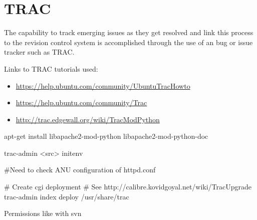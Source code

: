\chapter{TRAC}
        
The capability to track emerging issues as they get resolved and link
this process to the revision control system is accomplished through the use
of an bug or issue tracker such as TRAC.
        
Links to TRAC tutorials used:
\begin{itemize} 
  \item \url{https://help.ubuntu.com/community/UbuntuTracHowto}
  \item \url{https://help.ubuntu.com/community/Trac}
  \item \url{http://trac.edgewall.org/wiki/TracModPython}
\end{itemize} 


apt-get install libapache2-mod-python libapache2-mod-python-doc


trac-admin <src> initenv

#Need to check ANU configuration of httpd.conf

# Create cgi deployment
# See http://calibre.kovidgoyal.net/wiki/TracUpgrade
trac-admin index deploy /usr/share/trac


Permissions like with svn
